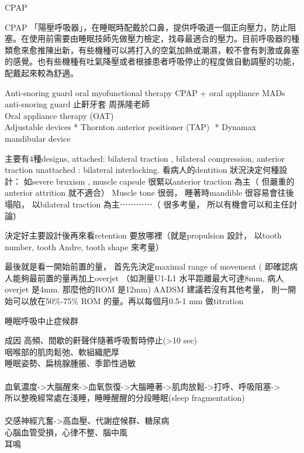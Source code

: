 \documentclass[aspectratio=169]{beamer}
\begin{document}
\begin{frame}{CPAP}
    \begin{block}{CPAP}
    「陽壓呼吸器」，在睡眠時配戴於口鼻，提供呼吸道一個正向壓力，防止阻塞。在使用前需要由睡眠技師先做壓力檢定，找尋最適合的壓力。目前呼吸器的種類愈來愈推陳出新，有些機種可以將打入的空氣加熱或潮濕，較不會有刺激或鼻塞的感覺。也有些機種有吐氣降壓或者根據患者呼吸停止的程度做自動調壓的功能，配戴起來較為舒適。
    \end{block}
\end{frame}

\begin{frame}{Anti-snoring guard}
oral myofunctional therapy
CPAP + oral appliance MADs
    anti-snoring guard 止鼾牙套 周孫隆老師\\
    Oral appliance therapy (OAT)\\
Adjustable devices
* Thornton anterior positioner (TAP) 
* Dynamax mandibular device

    主要有4種designs, 
attached: bilateral traction , bilateral compression, anterior traction 
unattached : bilateral interlocking. 
看病人的dentition 狀況決定何種設計： 如severe bruxism , muscle capsule 很緊以anterior traction 為主（ 但嚴重的anterior attrition 就不適合） 
Muscle tone 很弱， 睡著時mandible 很容易會往後塌陷， 以bilateral traction 為主⋯⋯⋯⋯（ 很多考量， 所以有機會可以和主任討論） 

決定好主要設計後再來看retention 要放哪裡（就是propulsion 設計， 以tooth number, tooth Andre, tooth shape 來考量） 

最後就是看一開始前置的量， 首先先決定maximal range of movement ( 即確認病人能夠最前置的量再加上overjet （如測量U1-L1 水平距離最大可達8mm, 病人overjet 是4mm. 那麼他的ROM 是12mm) 
AADSM 建議若沒有其他考量， 則一開始可以放在50\%-75\% ROM 的量。再以每個月0.5-1 mm 做titration
\end{frame}

\begin{frame}{睡眠呼吸中止症候群}
\begin{block}{成因}
高頻、間歇的鼾聲伴隨著呼吸暫時停止(>10 sec)\\
咽喉部的肌肉鬆弛、軟組織肥厚\\
睡眠姿勢、扁桃腺腫脹、季節性過敏\\
~\\
血氧濃度->大腦醒來->血氧恢復->大腦睡著->肌肉放鬆->打呼、呼吸阻塞->\\
所以整晚經常處在淺睡，睡睡醒醒的分段睡眠(sleep fragmentation)\\
~\\
交感神經亢奮->高血壓、代謝症候群、糖尿病\\
心腦血管受損，心律不整、腦中風\\
耳鳴
\end{block}

\end{frame}
\end{document}
